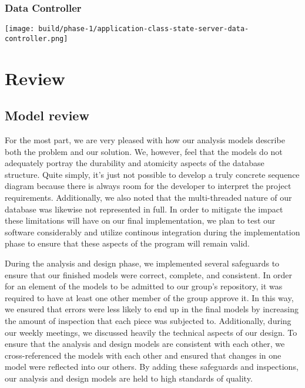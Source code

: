 \documentclass[a4paper]{report}
\begin{document}
	\subsection{Data Controller}
		\texttt{[image: build/phase-1/application-class-state-server-data-controller.png]}
	
\chapter{Review}

\section{Model review}

	For the most part, we are very pleased with how our analysis models describe both the problem and our solution. We, however, feel that the models do not adequately portray the durability and atomicity aspects of the database structure.  Quite simply, it's just not possible to develop a truly concrete sequence diagram because there is always room for the developer to interpret the project requirements. Additionally, we also noted that the multi-threaded nature of our database was likewise not represented in full.  In order to mitigate the impact these limitations will have on our final implementation, we plan to test our software considerably and utilize continous integration during the implementation phase to ensure that these aspects of the program will remain valid.

	During the analysis and design phase, we implemented several safeguards to ensure that our finished models were correct, complete, and consistent. In order for an element of the models to be admitted to our group's repository, it was required to have at least one other member of the group approve it. In this way, we ensured that errors were less likely to end up in the final models by increasing the amount of inspection that each piece was subjected to. Additionally, during our weekly meetings, we discussed heavily the technical aspects of our design. To ensure that the analysis and design models are consistent with each other, we cross-referenced the models with each other and ensured that changes in one model were reflected into our others. By adding these safeguards and inspections, our analysis and design models are held to high standards of quality.
\end{document}
